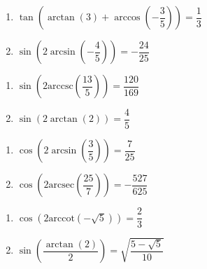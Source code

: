 \begin{multicols}{2}

\begin{enumerate}

\setcounter{enumi}{\value{HW}}

\item  $\tan\left( \arctan(3) + \arccos\left(-\dfrac{3}{5}\right) \right) = \dfrac{1}{3}$
\item  $\sin\left(2\arcsin\left(-\dfrac{4}{5}\right)\right)= -\dfrac{24}{25}$

\setcounter{HW}{\value{enumi}}

\end{enumerate}

\end{multicols}

\begin{multicols}{2}

\begin{enumerate}

\setcounter{enumi}{\value{HW}}

\item  $\sin\left(2\text{arccsc}\left(\dfrac{13}{5}\right)\right) = \dfrac{120}{169}$
\item  $\sin\left(2\arctan\left(2\right)\right) = \dfrac{4}{5}$ 

\setcounter{HW}{\value{enumi}}

\end{enumerate}

\end{multicols}

\begin{multicols}{2}

\begin{enumerate}

\setcounter{enumi}{\value{HW}}

\item  $\cos\left(2 \arcsin\left(\dfrac{3}{5}\right)\right) = \dfrac{7}{25}$
\item  $\cos\left(2 \text{arcsec}\left(\dfrac{25}{7}\right)\right) = -\dfrac{527}{625}$

\setcounter{HW}{\value{enumi}}

\end{enumerate}

\end{multicols}

\begin{multicols}{2}

\begin{enumerate}

\setcounter{enumi}{\value{HW}}

\item  $\cos\left(2 \text{arccot}\left(-\sqrt{5}\right)\right) = \dfrac{2}{3}$ 
\item  $\sin\left( \dfrac{\arctan(2)}{2} \right) = \sqrt{\dfrac{5-\sqrt{5}}{10}}$ 

\setcounter{HW}{\value{enumi}}

\end{enumerate}

\end{multicols}

